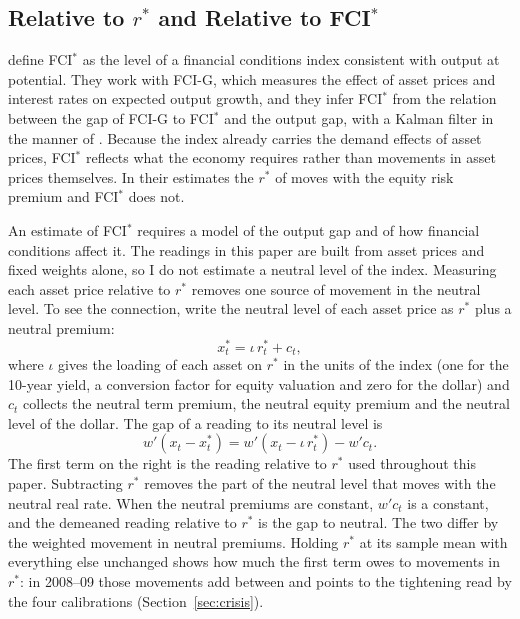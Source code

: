 \documentclass[11pt]{article}
\begin{document}
\subsection{Relative to $r^*$ and Relative to FCI$^*$}\label{sec:fcistar}
\citet{caballero2026} define FCI$^*$ as the level of a financial conditions index consistent with output at potential. They work with FCI-G, which measures the effect of asset prices and interest rates on expected output growth, and they infer FCI$^*$ from the relation between the gap of FCI-G to FCI$^*$ and the output gap, with a Kalman filter in the manner of \citet{laubach2003}. Because the index already carries the demand effects of asset prices, FCI$^*$ reflects what the economy requires rather than movements in asset prices themselves. In their estimates the $r^*$ of \citet{holston2023} moves with the equity risk premium and FCI$^*$ does not.

An estimate of FCI$^*$ requires a model of the output gap and of how financial conditions affect it. The readings in this paper are built from asset prices and fixed weights alone, so I do not estimate a neutral level of the index. Measuring each asset price relative to $r^*$ removes one source of movement in the neutral level. To see the connection, write the neutral level of each asset price as $r^*$ plus a neutral premium:
\begin{equation}\label{eq:neutral}
x^*_t=\iota\, r^*_t+c_t ,
\end{equation}
where $\iota$ gives the loading of each asset on $r^*$ in the units of the index (one for the 10-year yield, a conversion factor for equity valuation and zero for the dollar) and $c_t$ collects the neutral term premium, the neutral equity premium and the neutral level of the dollar. The gap of a reading to its neutral level is
\begin{equation}\label{eq:gapdecomp}
w'(x_t-x^*_t)=w'(x_t-\iota\, r^*_t)-w'c_t .
\end{equation}
The first term on the right is the reading relative to $r^*$ used throughout this paper. Subtracting $r^*$ removes the part of the neutral level that moves with the neutral real rate. When the neutral premiums are constant, $w'c_t$ is a constant, and the demeaned reading relative to $r^*$ is the gap to neutral. The two differ by the weighted movement in neutral premiums. Holding $r^*$ at its sample mean with everything else unchanged shows how much the first term owes to movements in $r^*$: in 2008--09 those movements add between  and  points to the tightening read by the four calibrations (Section~\ref{sec:crisis}).
\end{document}
